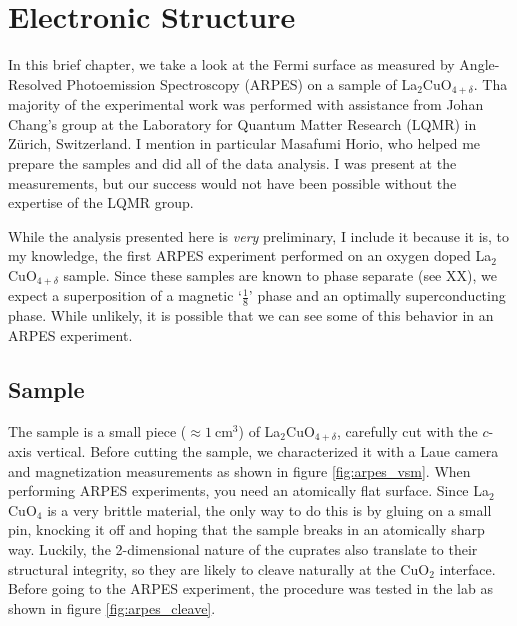 \chapter{Electronic Structure}\label{ch:arpes}
In this brief chapter, we take a look at the Fermi surface as measured by Angle-Resolved Photoemission Spectroscopy (ARPES) on a sample of La$_2$CuO$_{4+\delta}$. Tha majority of the experimental work was performed with assistance from Johan Chang's group at the Laboratory for Quantum Matter Research (LQMR) in Z\"urich, Switzerland. I mention in particular Masafumi Horio, who helped me prepare the samples and did all of the data analysis. I was present at the measurements, but our success would not have been possible without the expertise of the LQMR group.

While the analysis presented here is \emph{very} preliminary, I include it because it is, to my knowledge, the first ARPES experiment performed on an oxygen doped La$_2$CuO$_{4+\delta}$ sample. Since these samples are known to phase separate (see XX), we expect a superposition of a magnetic `$\frac{1}{8}$' phase and an optimally superconducting phase. While unlikely, it is possible that we can see some of this behavior in an ARPES experiment.

\section{Sample}
The sample is a small piece ($\approx \SI{1}{\centi\meter\cubed}$) of La$_2$CuO$_{4+\delta}$, carefully cut with the $c$-axis vertical. Before cutting the sample, we characterized it with a Laue camera and magnetization measurements as shown in figure \ref{fig:arpes_vsm}. When performing ARPES experiments, you need an atomically flat surface. Since La$_2$CuO$_4$ is a very brittle material, the only way to do this is by gluing on a small pin, knocking it off and hoping that the sample breaks in an atomically sharp way. Luckily, the 2-dimensional nature of the cuprates also translate to their structural integrity, so they are likely to cleave naturally at the CuO$_2$ interface. Before going to the ARPES experiment, the procedure was tested in the lab as shown in figure \ref{fig:arpes_cleave}.


